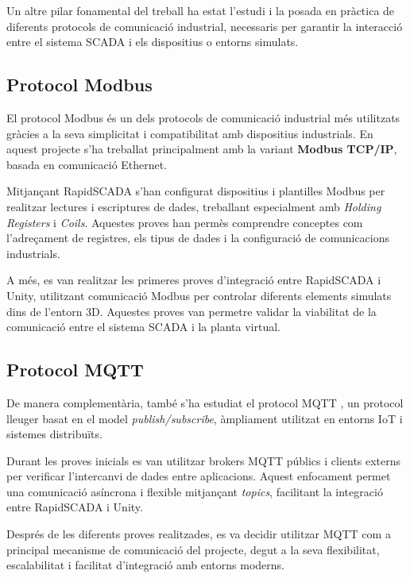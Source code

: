 \documentclass[12pt,a4paper]{report}
\begin{document}
Un altre pilar fonamental del treball ha estat l'estudi i la posada en pràctica de diferents protocols de comunicació industrial, necessaris per garantir la interacció entre el sistema SCADA i els dispositius o entorns simulats.

\subsection{Protocol Modbus}

El protocol Modbus és un dels protocols de comunicació industrial més utilitzats gràcies a la seva simplicitat i compatibilitat amb dispositius industrials. En aquest projecte s'ha treballat principalment amb la variant \textbf{Modbus TCP/IP}, basada en comunicació Ethernet.

Mitjançant RapidSCADA s'han configurat dispositius i plantilles Modbus per realitzar lectures i escriptures de dades, treballant especialment amb \textit{Holding Registers} i \textit{Coils}. Aquestes proves han permès comprendre conceptes com l'adreçament de registres, els tipus de dades i la configuració de comunicacions industrials.

A més, es van realitzar les primeres proves d'integració entre RapidSCADA i Unity, utilitzant comunicació Modbus per controlar diferents elements simulats dins de l'entorn 3D. Aquestes proves van permetre validar la viabilitat de la comunicació entre el sistema SCADA i la planta virtual.

\subsection{Protocol MQTT}

De manera complementària, també s'ha estudiat el protocol MQTT \cite{Team2015MQTT,mqtt_unity_guide}, un protocol lleuger basat en el model \textit{publish/subscribe}, àmpliament utilitzat en entorns IoT i sistemes distribuïts.

Durant les proves inicials es van utilitzar brokers MQTT públics i clients externs per verificar l'intercanvi de dades entre aplicacions. Aquest enfocament permet una comunicació asíncrona i flexible mitjançant \textit{topics}, facilitant la integració entre RapidSCADA i Unity.

Després de les diferents proves realitzades, es va decidir utilitzar MQTT com a principal mecanisme de comunicació del projecte, degut a la seva flexibilitat, escalabilitat i facilitat d'integració amb entorns moderns.
\end{document}
